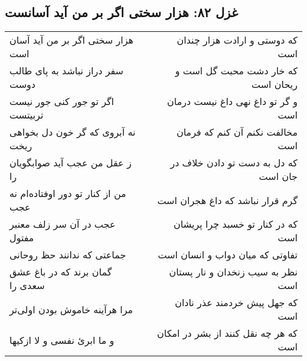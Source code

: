 \begin{center}
\section*{غزل ۸۲: هزار سختی اگر بر من آید آسانست}
\label{sec:082}
\begin{longtable}{l p{0.5cm} r}
هزار سختی اگر بر من آید آسان است
&&
که دوستی و ارادت هزار چندان است
\\
سفر دراز نباشد به پای طالب دوست
&&
که خار دشت محبت گل است و ریحان است
\\
اگر تو جور کنی جور نیست تربیتست
&&
و گر تو داغ نهی داغ نیست درمان است
\\
نه آبروی که گر خون دل بخواهی ریخت
&&
مخالفت نکنم آن کنم که فرمان است
\\
ز عقل من عجب آید صوابگویان را
&&
که دل به دست تو دادن خلاف در جان است
\\
من از کنار تو دور اوفتاده‌ام نه عجب
&&
گرم قرار نباشد که داغ هجران است
\\
عجب در آن سر زلف معنبر مفتول
&&
که در کنار تو خسبد چرا پریشان است
\\
جماعتی که ندانند حظ روحانی
&&
تفاوتی که میان دواب و انسان است
\\
گمان برند که در باغ عشق سعدی را
&&
نظر به سیب زنخدان و نار پستان است
\\
مرا هرآینه خاموش بودن اولی‌تر
&&
که جهل پیش خردمند عذر نادان است
\\
و ما ابرئ نفسی و لا ازکیها
&&
که هر چه نقل کنند از بشر در امکان است
\\
\end{longtable}
\end{center}
